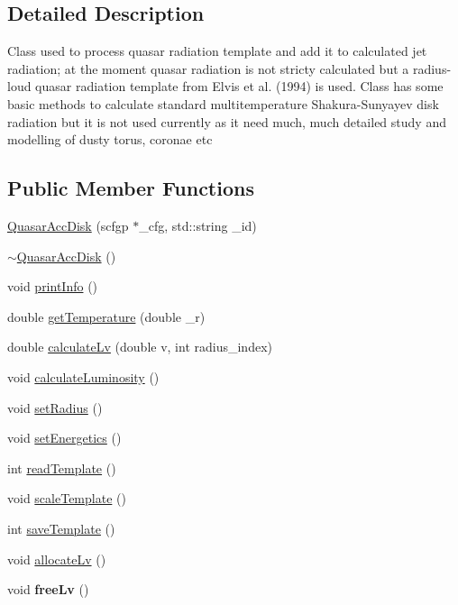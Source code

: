 \subsection{Detailed Description}
Class used to process quasar radiation template and add it to calculated jet radiation; at the moment quasar radiation is not stricty calculated but a radius-\/loud quasar radiation template from Elvis et al. (1994) is used. Class has some basic methods to calculate standard multitemperature Shakura-\/\-Sunyayev disk radiation but it is not used currently as it need much, much detailed study and modelling of dusty torus, coronae etc \subsection*{Public Member Functions}
\begin{DoxyCompactItemize}
\item 
\hyperlink{classQuasarAccDisk_af3ebbefab21b01d1a4d86199fb2f643c}{Quasar\-Acc\-Disk} (scfgp $\ast$\-\_\-cfg, std\-::string \-\_\-id)
\item 
\hyperlink{classQuasarAccDisk_ab562cc81ade45ea51cf3ab27f7885d07}{$\sim$\-Quasar\-Acc\-Disk} ()
\item 
void \hyperlink{classQuasarAccDisk_aab9e9fbad17ba40931219473918896a7}{print\-Info} ()
\item 
double \hyperlink{classQuasarAccDisk_ac4abec686db321e73e0186ae8c6cd16c}{get\-Temperature} (double \-\_\-r)
\item 
double \hyperlink{classQuasarAccDisk_a8a29f029fd2e38784bce7dbe8f9533d2}{calculate\-Lv} (double v, int radius\-\_\-index)
\item 
void \hyperlink{classQuasarAccDisk_a60c8439e66b7a9933e35eeb6fe12dd89}{calculate\-Luminosity} ()
\item 
void \hyperlink{classQuasarAccDisk_ad565b960520076ca8e82d10286e05aef}{set\-Radius} ()
\item 
void \hyperlink{classQuasarAccDisk_a8f1f855a229a0247e3b4af731b9d7b29}{set\-Energetics} ()
\item 
int \hyperlink{classQuasarAccDisk_a8e81488ad8604d0b4b1ebb904a5830da}{read\-Template} ()
\item 
void \hyperlink{classQuasarAccDisk_a632f415a0df6afd015f27c8ae447129b}{scale\-Template} ()
\item 
int \hyperlink{classQuasarAccDisk_a64ce6d4ea6be61e97b9bc5c1a87398e5}{save\-Template} ()
\item 
void \hyperlink{classQuasarAccDisk_a88d65d7d654293daedabbb0ecbd81d72}{allocate\-Lv} ()
\item 
\hypertarget{classQuasarAccDisk_a5369e43384d98b527114e81412445b56}{void {\bfseries free\-Lv} ()}\label{classQuasarAccDisk_a5369e43384d98b527114e81412445b56}


\end{DoxyCompactItemize}

